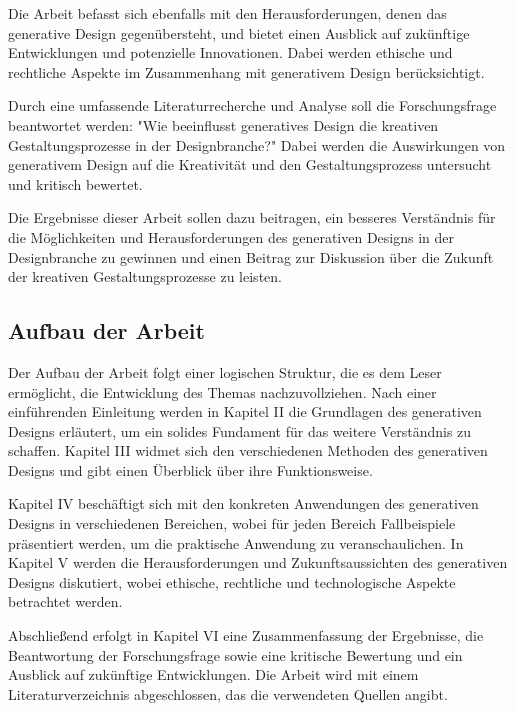 Die Arbeit befasst sich ebenfalls mit den Herausforderungen, denen das generative Design gegenübersteht, und bietet einen Ausblick auf zukünftige Entwicklungen und potenzielle Innovationen. Dabei werden ethische und rechtliche Aspekte im Zusammenhang mit generativem Design berücksichtigt. 

Durch eine umfassende Literaturrecherche und Analyse soll die Forschungsfrage beantwortet werden: "Wie beeinflusst generatives Design die kreativen Gestaltungsprozesse in der Designbranche?" Dabei werden die Auswirkungen von generativem Design auf die Kreativität und den Gestaltungsprozess untersucht und kritisch bewertet. 

Die Ergebnisse dieser Arbeit sollen dazu beitragen, ein besseres Verständnis für die Möglichkeiten und Herausforderungen des generativen Designs in der Designbranche zu gewinnen und einen Beitrag zur Diskussion über die Zukunft der kreativen Gestaltungsprozesse zu leisten.

\subsection*{Aufbau der Arbeit}
Der Aufbau der Arbeit folgt einer logischen Struktur, die es dem Leser ermöglicht, die Entwicklung des Themas nachzuvollziehen. Nach einer einführenden Einleitung werden in Kapitel II die Grundlagen des generativen Designs erläutert, um ein solides Fundament für das weitere Verständnis zu schaffen. Kapitel III widmet sich den verschiedenen Methoden des generativen Designs und gibt einen Überblick über ihre Funktionsweise.

Kapitel IV beschäftigt sich mit den konkreten Anwendungen des generativen Designs in verschiedenen Bereichen, wobei für jeden Bereich Fallbeispiele präsentiert werden, um die praktische Anwendung zu veranschaulichen. In Kapitel V werden die Herausforderungen und Zukunftsaussichten des generativen Designs diskutiert, wobei ethische, rechtliche und technologische Aspekte betrachtet werden.

Abschließend erfolgt in Kapitel VI eine Zusammenfassung der Ergebnisse, die Beantwortung der Forschungsfrage sowie eine kritische Bewertung und ein Ausblick auf zukünftige Entwicklungen. Die Arbeit wird mit einem Literaturverzeichnis abgeschlossen, das die verwendeten Quellen angibt.




